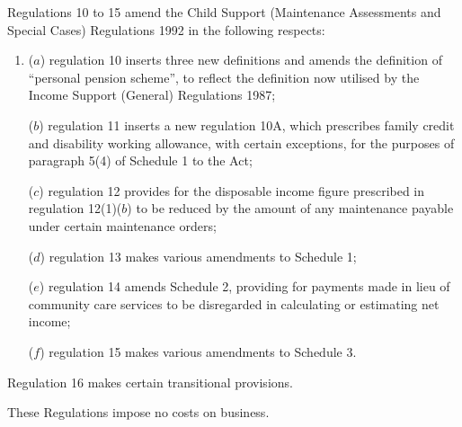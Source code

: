 \documentclass[12pt,a4paper]{article}
\begin{document}
 Regulations 10 to 15 amend the Child Support (Maintenance Assessments and Special Cases) Regulations 1992 in the following respects:
\begin{enumerate}\item[]
 ($a$) regulation 10 inserts three new definitions and amends the definition of “personal pension scheme”, to reflect the definition now utilised by the Income Support (General) Regulations 1987;

 ($b$) regulation 11 inserts a new regulation 10A, which prescribes family credit and disability working allowance, with certain exceptions, for the purposes of paragraph 5(4) of Schedule 1 to the Act;

 ($c$) regulation 12 provides for the disposable income figure prescribed in regulation 12(1)($b$) to be reduced by the amount of any maintenance payable under certain maintenance orders;

 ($d$) regulation 13 makes various amendments to Schedule 1;

 ($e$) regulation 14 amends Schedule 2, providing for payments made in lieu of community care services to be disregarded in calculating or estimating net income;

 ($f$) regulation 15 makes various amendments to Schedule 3.
\end{enumerate}

  Regulation 16 makes certain transitional provisions.

  These Regulations impose no costs on business.
\end{document}
